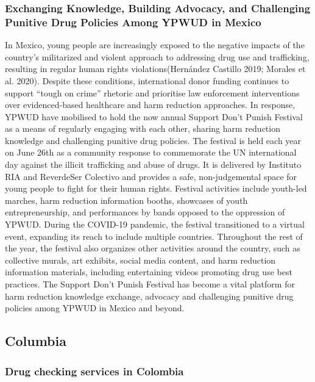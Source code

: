\documentclass[
  letterpaper,
  DIV=11,
  numbers=noendperiod]{scrartcl}
\begin{document}
\subsubsection{Exchanging Knowledge, Building Advocacy, and Challenging
Punitive Drug Policies Among YPWUD in
Mexico}\label{exchanging-knowledge-building-advocacy-and-challenging-punitive-drug-policies-among-ypwud-in-mexico}

In Mexico, young people are increasingly exposed to the negative impacts
of the country's militarized and violent approach to addressing drug use
and trafficking, resulting in regular human rights violations(Hernández
Castillo 2019; Morales et al. 2020). Despite these conditions,
international donor funding continues to support ``tough on crime''
rhetoric and prioritise law enforcement interventions over
evidenced-based healthcare and harm reduction approaches. In response,
YPWUD have mobilised to hold the now annual Support Don't Punish
Festival as a means of regularly engaging with each other, sharing harm
reduction knowledge and challenging punitive drug policies. The festival
is held each year on June 26th as a community response to commemorate
the UN international day against the illicit trafficking and abuse of
drugs. It is delivered by Instituto RIA and ReverdeSer Colectivo and
provides a safe, non-judgemental space for young people to fight for
their human rights. Festival activities include youth-led marches, harm
reduction information booths, showcases of youth entrepreneurship, and
performances by bands opposed to the oppression of YPWUD. During the
COVID-19 pandemic, the festival transitioned to a virtual event,
expanding its reach to include multiple countries. Throughout the rest
of the year, the festival also organizes other activities around the
country, such as collective murals, art exhibits, social media content,
and harm reduction information materials, including entertaining videos
promoting drug use best practices. The Support Don't Punish Festival has
become a vital platform for harm reduction knowledge exchange, advocacy
and challenging punitive drug policies among YPWUD in Mexico and beyond.

\subsection{Columbia}

\subsubsection{Drug checking services in
Colombia}\label{sec-drug-checking}
\end{document}
